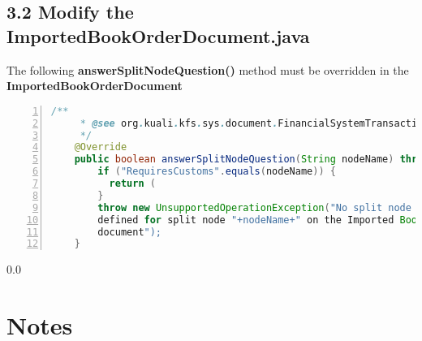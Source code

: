 \subsection*{3.2 Modify the ImportedBookOrderDocument.java}
The following \textbf{answerSplitNodeQuestion()} method must be overridden in the \textbf{ImportedBookOrderDocument}
\begin{lstlisting}[numbers=left,language=java,basicstyle=\scriptsize,backgroundcolor=\color{ubergray},caption={New
  KIM Type},frame=single,breaklines=true]
    /**
     * @see org.kuali.kfs.sys.document.FinancialSystemTransactionalDocumentBase#answerSplitNodeQuestion(java.lang.String)
     */
    @Override
    public boolean answerSplitNodeQuestion(String nodeName) throws UnsupportedOperationException {
        if ("RequiresCustoms".equals(nodeName)) {
          return (
        }
        throw new UnsupportedOperationException("No split node logic
        defined for split node "+nodeName+" on the Imported Book Order
        document");
    }
\end{lstlisting}


\newpage
  {\setlength{\baselineskip}%
           {0.0\baselineskip}
  \section*{Notes}
  \hrulefill \par}
